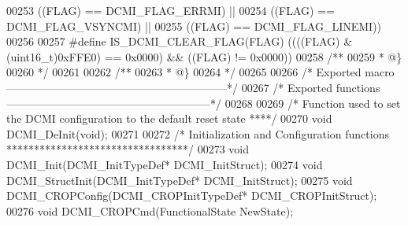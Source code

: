\begin{DoxyCode}
00253                                 \textcolor{preprocessor}{(}\textcolor{preprocessor}{(}\textcolor{preprocessor}{FLAG}\textcolor{preprocessor}{)} \textcolor{preprocessor}{==} DCMI_FLAG_ERRMI\textcolor{preprocessor}{)} \textcolor{preprocessor}{||}
00254                                 \textcolor{preprocessor}{(}\textcolor{preprocessor}{(}\textcolor{preprocessor}{FLAG}\textcolor{preprocessor}{)} \textcolor{preprocessor}{==} DCMI_FLAG_VSYNCMI\textcolor{preprocessor}{)} \textcolor{preprocessor}{||}
00255                                 \textcolor{preprocessor}{(}\textcolor{preprocessor}{(}\textcolor{preprocessor}{FLAG}\textcolor{preprocessor}{)} \textcolor{preprocessor}{==} DCMI_FLAG_LINEMI\textcolor{preprocessor}{)}\textcolor{preprocessor}{)}
00256 
00257 \textcolor{preprocessor}{#}\textcolor{preprocessor}{define} \textcolor{preprocessor}{IS\_DCMI\_CLEAR\_FLAG}\textcolor{preprocessor}{(}\textcolor{preprocessor}{FLAG}\textcolor{preprocessor}{)} \textcolor{preprocessor}{(}\textcolor{preprocessor}{(}\textcolor{preprocessor}{(}\textcolor{preprocessor}{(}\textcolor{preprocessor}{FLAG}\textcolor{preprocessor}{)} \textcolor{preprocessor}{&} \textcolor{preprocessor}{(}\textcolor{preprocessor}{uint16\_t}\textcolor{preprocessor}{)}0xFFE0\textcolor{preprocessor}{)} \textcolor{preprocessor}{==} 0x0000\textcolor{preprocessor}{)} \textcolor{preprocessor}{&&} \textcolor{preprocessor}{(}\textcolor{preprocessor}{(}\textcolor{preprocessor}{FLAG}\textcolor{preprocessor}{)} \textcolor{preprocessor}{!=} 0x0000\textcolor{preprocessor}{)}\textcolor{preprocessor}{)}
00258 \textcolor{comment}{/**}
00259 \textcolor{comment}{  * @\}}
00260 \textcolor{comment}{  */}
00261 
00262 \textcolor{comment}{/**}
00263 \textcolor{comment}{  * @\}}
00264 \textcolor{comment}{  */}
00265 
00266 \textcolor{comment}{/* Exported macro ------------------------------------------------------------*/}
00267 \textcolor{comment}{/* Exported functions --------------------------------------------------------*/}
00268 
00269 \textcolor{comment}{/*  Function used to set the DCMI configuration to the default reset state ****/}
00270 \textcolor{keywordtype}{void} DCMI_DeInit(\textcolor{keywordtype}{void});
00271 
00272 \textcolor{comment}{/* Initialization and Configuration functions *********************************/}
00273 \textcolor{keywordtype}{void} DCMI_Init(DCMI\_InitTypeDef* DCMI\_InitStruct);
00274 \textcolor{keywordtype}{void} DCMI_StructInit(DCMI\_InitTypeDef* DCMI\_InitStruct);
00275 \textcolor{keywordtype}{void} DCMI_CROPConfig(DCMI\_CROPInitTypeDef* DCMI\_CROPInitStruct);
00276 \textcolor{keywordtype}{void} DCMI_CROPCmd(FunctionalState NewState);

\end{DoxyCode}
